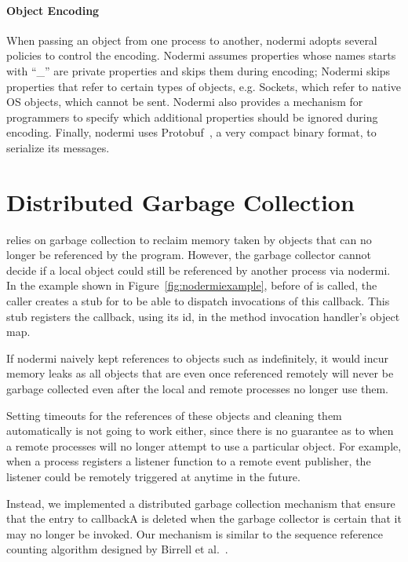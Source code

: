 \paragraph{Object Encoding}
When passing an object from one process to another,
nodermi adopts several policies to control the encoding.
Nodermi assumes properties whose names starts with ``\_'' are
private properties and skips them during encoding;
Nodermi skips properties that refer to certain types of objects, e.g. Sockets,
which refer to native OS objects, which cannot be sent.
Nodermi also provides a mechanism for programmers to specify which
additional properties should be ignored during encoding.
Finally, nodermi uses Protobuf~\cite{protobuf}, a very compact
binary format, to serialize its messages.


\section{Distributed Garbage Collection}
\js{} relies on garbage collection to reclaim memory taken by
objects that can no longer be referenced by the program.
However, the garbage collector cannot decide if a local object
could still be referenced by another process via nodermi.
In the example shown in Figure~\ref{fig:nodermiexample},
before  of  is called,
the caller creates a stub for  to be able
to dispatch invocations of this callback.
This stub registers the callback, using its id, in the
method invocation handler's object map.

If nodermi naively kept references to objects such as
 indefinitely, it would incur memory leaks as all
objects that are even once referenced remotely will never be garbage
collected even after the local and remote processes no longer use them.

Setting timeouts for the references of these objects and cleaning
them automatically is not going to work either,
since there is no guarantee as to when a remote processes will
no longer attempt to use a particular object.
For example, when a process registers a listener function to a remote event publisher,
the listener could be remotely triggered at anytime in the future.

Instead, we implemented a distributed garbage collection mechanism
that ensure that the entry to callbackA is deleted when the
garbage collector is certain that it may no longer be invoked.
Our mechanism is similar to the sequence reference counting algorithm
designed by Birrell et al.~\cite{birrell1993distributed}.

